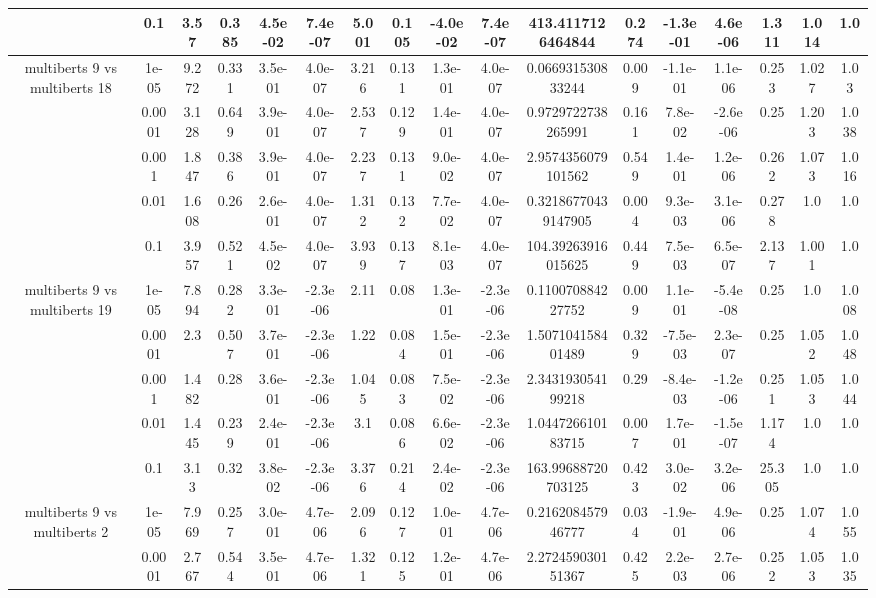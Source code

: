 \begin{tabular}{|c|c|c|c|c|c|c|c|c|c|c|c|c|c|c|c|c|}
 & 0.1 & 3.57 & 0.385 & 4.5e-02 & 7.4e-07 & 5.001 & 0.105 & -4.0e-02 & 7.4e-07 & 413.4117126464844 & 0.274 & -1.3e-01 & 4.6e-06 & 1.311 & 1.014 & 1.0 \\
\hline
\multirow{5}{*}{multiberts 9 vs multiberts 18} & 1e-05 & 9.272 & 0.331 & 3.5e-01 & 4.0e-07 & 3.216 & 0.131 & 1.3e-01 & 4.0e-07 & 0.066931530833244 & 0.009 & -1.1e-01 & 1.1e-06 & 0.253 & 1.027 & 1.03 \\
 & 0.0001 & 3.128 & 0.649 & 3.9e-01 & 4.0e-07 & 2.537 & 0.129 & 1.4e-01 & 4.0e-07 & 0.9729722738265991 & 0.161 & 7.8e-02 & -2.6e-06 & 0.25 & 1.203 & 1.038 \\
 & 0.001 & 1.847 & 0.386 & 3.9e-01 & 4.0e-07 & 2.237 & 0.131 & 9.0e-02 & 4.0e-07 & 2.9574356079101562 & 0.549 & 1.4e-01 & 1.2e-06 & 0.262 & 1.073 & 1.016 \\
 & 0.01 & 1.608 & 0.26 & 2.6e-01 & 4.0e-07 & 1.312 & 0.132 & 7.7e-02 & 4.0e-07 & 0.32186770439147905 & 0.004 & 9.3e-03 & 3.1e-06 & 0.278 & 1.0 & 1.0 \\
 & 0.1 & 3.957 & 0.521 & 4.5e-02 & 4.0e-07 & 3.939 & 0.137 & 8.1e-03 & 4.0e-07 & 104.39263916015625 & 0.449 & 7.5e-03 & 6.5e-07 & 2.137 & 1.001 & 1.0 \\
\hline
\multirow{5}{*}{multiberts 9 vs multiberts 19} & 1e-05 & 7.894 & 0.282 & 3.3e-01 & -2.3e-06 & 2.11 & 0.08 & 1.3e-01 & -2.3e-06 & 0.110070884227752 & 0.009 & 1.1e-01 & -5.4e-08 & 0.25 & 1.0 & 1.008 \\
 & 0.0001 & 2.3 & 0.507 & 3.7e-01 & -2.3e-06 & 1.22 & 0.084 & 1.5e-01 & -2.3e-06 & 1.507104158401489 & 0.329 & -7.5e-03 & 2.3e-07 & 0.25 & 1.052 & 1.048 \\
 & 0.001 & 1.482 & 0.28 & 3.6e-01 & -2.3e-06 & 1.045 & 0.083 & 7.5e-02 & -2.3e-06 & 2.343193054199218 & 0.29 & -8.4e-03 & -1.2e-06 & 0.251 & 1.053 & 1.044 \\
 & 0.01 & 1.445 & 0.239 & 2.4e-01 & -2.3e-06 & 3.1 & 0.086 & 6.6e-02 & -2.3e-06 & 1.044726610183715 & 0.007 & 1.7e-01 & -1.5e-07 & 1.174 & 1.0 & 1.0 \\
 & 0.1 & 3.13 & 0.32 & 3.8e-02 & -2.3e-06 & 3.376 & 0.214 & 2.4e-02 & -2.3e-06 & 163.99688720703125 & 0.423 & 3.0e-02 & 3.2e-06 & 25.305 & 1.0 & 1.0 \\
\hline
\multirow{5}{*}{multiberts 9 vs multiberts 2} & 1e-05 & 7.969 & 0.257 & 3.0e-01 & 4.7e-06 & 2.096 & 0.127 & 1.0e-01 & 4.7e-06 & 0.216208457946777 & 0.034 & -1.9e-01 & 4.9e-06 & 0.25 & 1.074 & 1.055 \\
 & 0.0001 & 2.767 & 0.544 & 3.5e-01 & 4.7e-06 & 1.321 & 0.125 & 1.2e-01 & 4.7e-06 & 2.272459030151367 & 0.425 & 2.2e-03 & 2.7e-06 & 0.252 & 1.053 & 1.035 \\

\end{tabular}

